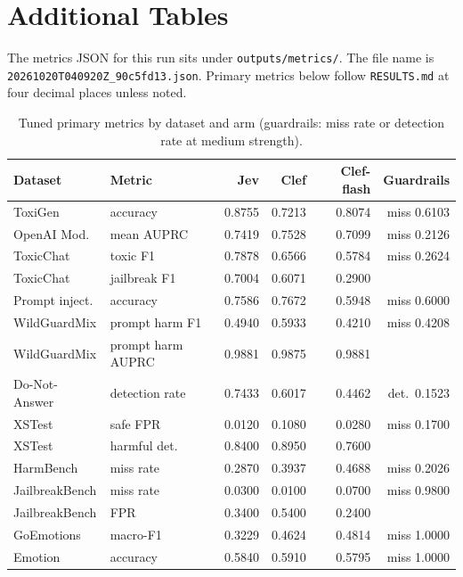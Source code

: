 \section{Additional Tables}
\label{sec:appendix-tables}

The metrics JSON for this run sits under \texttt{outputs/metrics/}.
The file name is \texttt{20261020T040920Z\_\allowbreak 90c5fd13.json}.
Primary metrics below follow \texttt{RESULTS.md} at four decimal places unless noted.

\begin{table}[htbp]
\centering
\caption{Tuned primary metrics by dataset and arm (guardrails: miss rate or detection rate at medium strength).}
\label{tab:core-pack}
\small
\begin{tabular}{@{}llrrrr@{}}
\toprule
Dataset & Metric & Jev & Clef & Clef-flash & Guardrails \\
\midrule
ToxiGen & accuracy & 0.8755 & 0.7213 & 0.8074 & miss 0.6103 \\
OpenAI Mod. & mean AUPRC & 0.7419 & 0.7528 & 0.7099 & miss 0.2126 \\
ToxicChat & toxic F1 & 0.7878 & 0.6566 & 0.5784 & miss 0.2624 \\
ToxicChat & jailbreak F1 & 0.7004 & 0.6071 & 0.2900 & \\
Prompt inject. & accuracy & 0.7586 & 0.7672 & 0.5948 & miss 0.6000 \\
WildGuardMix & prompt harm F1 & 0.4940 & 0.5933 & 0.4210 & miss 0.4208 \\
WildGuardMix & prompt harm AUPRC & 0.9881 & 0.9875 & 0.9881 & \\
Do-Not-Answer & detection rate & 0.7433 & 0.6017 & 0.4462 & det.\ 0.1523 \\
XSTest & safe FPR & 0.0120 & 0.1080 & 0.0280 & miss 0.1700 \\
XSTest & harmful det. & 0.8400 & 0.8950 & 0.7600 & \\
HarmBench & miss rate & 0.2870 & 0.3937 & 0.4688 & miss 0.2026 \\
JailbreakBench & miss rate & 0.0300 & 0.0100 & 0.0700 & miss 0.9800 \\
JailbreakBench & FPR & 0.3400 & 0.5400 & 0.2400 & \\
GoEmotions & macro-F1 & 0.3229 & 0.4624 & 0.4814 & miss 1.0000 \\
Emotion & accuracy & 0.5840 & 0.5910 & 0.5795 & miss 1.0000 \\
\bottomrule
\end{tabular}
\end{table}

